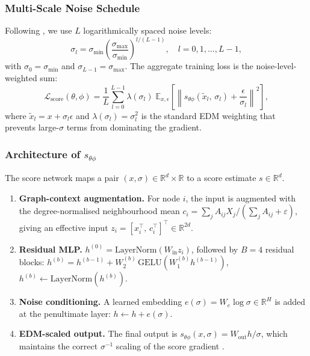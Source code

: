 \subsubsection{Multi-Scale Noise Schedule}

Following \citet{Song2019ncsn}, we use $L$ logarithmically spaced noise
levels:
\begin{equation}\label{eq:schedule}
\sigma_l
= \sigma_{\min}\!\left(\frac{\sigma_{\max}}{\sigma_{\min}}\right)^{\!l/(L-1)},
\quad l = 0, 1, \ldots, L-1,
\end{equation}
with $\sigma_0 = \sigma_{\min}$ and $\sigma_{L-1} = \sigma_{\max}$.
The aggregate training loss is the noise-level-weighted sum:
\begin{equation}\label{eq:loss_score}
\mathcal{L}_{\mathrm{score}}(\theta, \phi)
= \frac{1}{L}\sum_{l=0}^{L-1}
  \lambda(\sigma_l)\;
  \mathbb{E}_{x, \epsilon}\!\left[
    \left\| s_{\theta\phi}\!\left(
        \tilde{x}_l,\, \sigma_l
      \right) + \frac{\epsilon}{\sigma_l}
    \right\|^2
  \right],
\end{equation}
where $\tilde{x}_l = x + \sigma_l\epsilon$ and
$\lambda(\sigma_l) = \sigma_l^2$ is the standard EDM weighting
\citep{Karras2022edm} that prevents large-$\sigma$ terms from dominating the
gradient.

\subsubsection{Architecture of $s_{\theta\phi}$}

The score network maps a pair $(x, \sigma) \in \mathbb{R}^d \times \mathbb{R}$
to a score estimate $s \in \mathbb{R}^d$.
\begin{enumerate}
    \item \textbf{Graph-context augmentation.}
    For node $i$, the input is augmented with the degree-normalised neighbourhood
    mean $c_i = \sum_j A_{ij} X_j / (\sum_j A_{ij} + \varepsilon)$, giving an
    effective input $z_i = [x_i^\top,\, c_i^\top]^\top \in \mathbb{R}^{2d}$.
    \item \textbf{Residual MLP.}
    $h^{(0)} = \mathrm{LayerNorm}(W_{\mathrm{in}} z_i)$,
    followed by $B = 4$ residual blocks:
    $h^{(b)} = h^{(b-1)} + W_2^{(b)}\,\mathrm{GELU}(W_1^{(b)} h^{(b-1)})$,
    $h^{(b)} \leftarrow \mathrm{LayerNorm}(h^{(b)})$.
    \item \textbf{Noise conditioning.}
    A learned embedding $e(\sigma) = W_e \log\sigma \in \mathbb{R}^H$ is
    added at the penultimate layer: $h \leftarrow h + e(\sigma)$.
    \item \textbf{EDM-scaled output.}
    The final output is $s_{\theta\phi}(x, \sigma)
    = W_{\mathrm{out}} h / \sigma$,
    which maintains the correct $\sigma^{-1}$ scaling of the score gradient
    \citep{Karras2022edm}.
\end{enumerate}

